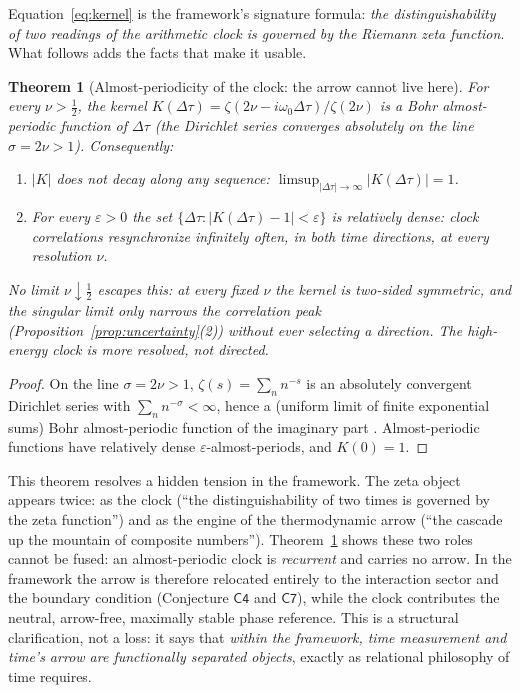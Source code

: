 \documentclass[11pt,a4paper]{article}
\theoremstyle{plain}
\newtheorem{theorem}{Theorem}[section]
\theoremstyle{definition}
\theoremstyle{remark}
\begin{document}
Equation~\eqref{eq:kernel} is the framework's signature formula: \emph{the
distinguishability of two readings of the arithmetic clock is governed by the Riemann zeta
function}. What follows adds
the facts that make it usable.

\begin{theorem}[Almost-periodicity of the clock: the arrow cannot live here]\label{thm:bohr}
For every $\nu>\tfrac12$, the kernel $K(\Delta\tau)=\zeta(2\nu-i\omega_{0}\Delta\tau)/\zeta(2\nu)$
is a Bohr almost-periodic function of $\Delta\tau$ \cite{besicovitch1932} (the Dirichlet series
converges absolutely on the line $\sigma=2\nu>1$). Consequently:
\begin{enumerate}[leftmargin=1.6em]
\item $|K|$ does \emph{not} decay along any sequence: $\limsup_{|\Delta\tau|\to\infty}|K(\Delta\tau)|=1$.
\item For every $\varepsilon>0$ the set
$\{\Delta\tau:|K(\Delta\tau)-1|<\varepsilon\}$ is relatively dense: clock correlations
resynchronize infinitely often, in both time directions, at every resolution $\nu$.
\end{enumerate}
No limit $\nu\downarrow\tfrac12$ escapes this: at every fixed $\nu$ the kernel is two-sided
symmetric, and the singular limit only narrows the correlation peak
(Proposition~\ref{prop:uncertainty}(2)) without ever selecting a direction. The high-energy
clock is \emph{more} resolved, not \emph{directed}.
\end{theorem}

\begin{proof}
On the line $\sigma=2\nu>1$, $\zeta(s)=\sum_{n}n^{-s}$ is an absolutely convergent Dirichlet
series with $\sum_{n}n^{-\sigma}<\infty$, hence a (uniform limit of finite exponential sums)
Bohr almost-periodic function of the imaginary part \cite{besicovitch1932}. Almost-periodic
functions have relatively dense $\varepsilon$-almost-periods, and $K(0)=1$.
\end{proof}

This theorem resolves a hidden tension in the framework. The zeta
object appears twice: as the clock (``the distinguishability of two times is
governed by the zeta function'') and as the engine of the thermodynamic arrow (``the
cascade up the mountain of composite numbers''). Theorem~\ref{thm:bohr} shows
these two roles cannot be fused: an almost-periodic clock is \emph{recurrent} and carries no
arrow. In the framework the arrow is therefore relocated entirely to the
interaction sector and the boundary condition (Conjecture $\mathsf{C4}$ and $\mathsf{C7}$),
while the clock contributes the neutral, arrow-free, maximally stable phase reference. This
is a structural clarification, not a loss: it says that \emph{within the framework, time
measurement and time's arrow are functionally separated objects}, exactly as relational
philosophy of time requires.
\end{document}
